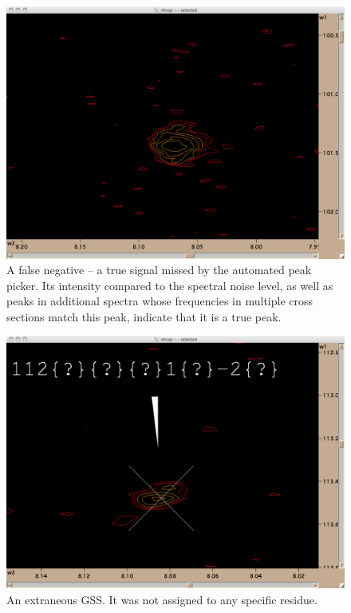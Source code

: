 \begin{figure}
  \includegraphics[scale=0.25]{figures/false_negative}
  \caption[A false negative -- a true signal missed by the automated peak picker.]
          {A false negative -- a true signal missed by the automated peak picker.
           Its intensity compared to the spectral noise level, as well as 
           peaks in additional spectra whose frequencies in multiple cross
           sections match this peak, indicate that it is a true peak.}
  \label{false_negative}
\end{figure}

\begin{figure}
  \includegraphics[scale=0.25]{figures/extraneous_gss}
  \caption{An extraneous GSS.  It was not assigned to any specific residue.}
  \label{extraneous_gss}
\end{figure}

